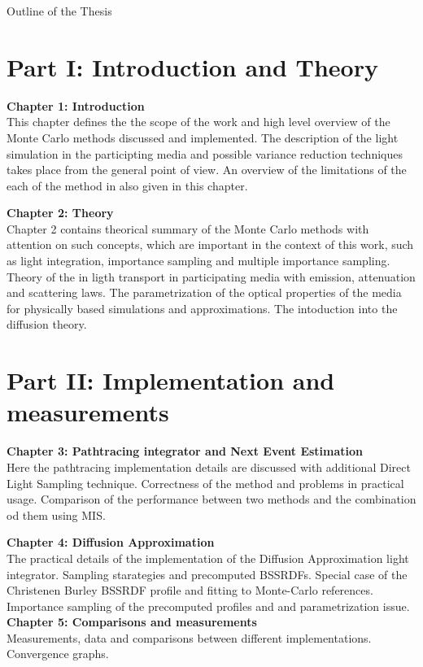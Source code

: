 \newpage

{}

\begin{center}
	\huge{Outline of the Thesis}
\end{center}

\section*{Part I: Introduction and Theory}

\textbf{ Chapter 1: Introduction}\\
This chapter defines the the scope of the work and high level
overview of the Monte Carlo methods discussed and implemented. The description
of the light simulation in the participting media and possible variance reduction techniques
takes place from the general point of view. An overview
of the limitations of the each of the method in also given in this chapter.

\textbf{Chapter 2: Theory}\\
Chapter 2 contains theorical summary of the Monte Carlo methods with attention
on such concepts, which are important in the context of this work, such
as light integration, importance sampling and multiple importance sampling.
Theory of the in ligth transport in participating media with emission,
attenuation and scattering laws.
The parametrization of the optical properties of the media for physically based
simulations and approximations. The intoduction into the diffusion theory.

\section*{Part II: Implementation and measurements}

\textbf{ Chapter 3: Pathtracing integrator and Next Event Estimation}\\
Here the pathtracing implementation details are discussed with additional Direct
Light Sampling technique. Correctness of the method and problems in practical
usage. Comparison of the performance between two methods and the combination od
them using MIS.

\textbf{ Chapter 4: Diffusion Approximation}\\
The practical details of the implementation of the Diffusion Approximation
light integrator. Sampling starategies and precomputed BSSRDFs. Special case of
the Christenen Burley BSSRDF profile and fitting to Monte-Carlo references.
Importance sampling of the precomputed profiles and and parametrization issue.
\newline
\newline
{}
\textbf{ Chapter 5: Comparisons and measurements}\\
Measurements, data and comparisons between different
implementations. Convergence graphs.
